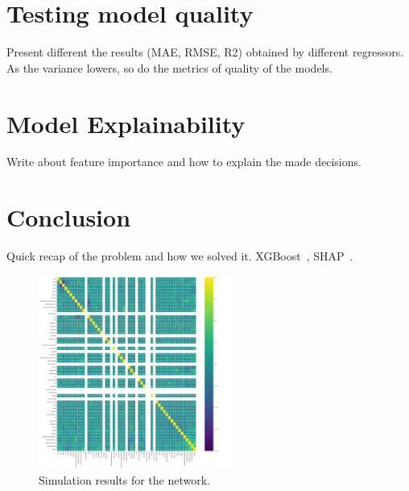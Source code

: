 \documentclass[conference,compsoc]{IEEEtran}
\begin{document}




\section{Testing model quality}
Present different the results (MAE, RMSE, R2) obtained by different regressors.
As the variance lowers, so do the metrics of quality of the models.

\section{Model Explainability}
Write about feature importance and how to explain the made decisions.


\section{Conclusion}
Quick recap of the problem and how we solved it.
XGBoost~\cite{chen2016xgboost}, SHAP~\cite{lundberg2020local2global}.

\begin{figure}[!t]
\centering
\includegraphics[width=2.5in]{feature_correlation.png}
\caption{Simulation results for the network.}
\label{fig_sim}
\end{figure}
\end{document}
